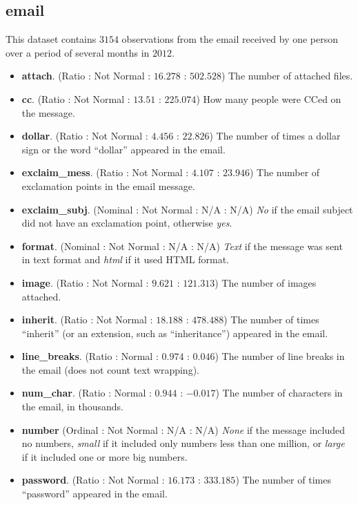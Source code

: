 \subsection{email}

This dataset contains $ 3154 $ observations from the email received by one person over a period of several months in $ 2012 $.

\begin{itemize}
  \item \textbf{attach}. (Ratio : Not Normal : $ 16.278 $ : $ 502.528 $) The number of attached files. 
  \item \textbf{cc}. (Ratio : Not Normal : $ 13.51 $ : $ 225.074 $) How many people were CCed on the message.
  \item \textbf{dollar}. (Ratio : Not Normal : $ 4.456 $ : $ 22.826 $) The number of times a dollar sign or the word ``dollar'' appeared in the email.
  \item \textbf{exclaim\_mess}. (Ratio : Not Normal : $ 4.107 $ : $ 23.946 $) The number of exclamation points in the email message.
  \item \textbf{exclaim\_subj}. (Nominal : Not Normal : N/A : N/A) \textit{No} if the email subject did not have an exclamation point, otherwise \textit{yes}.
  \item \textbf{format}. (Nominal : Not Normal : N/A : N/A) \textit{Text} if the message was sent in text format and \textit{html} if it used HTML format.
  \item \textbf{image}. (Ratio : Not Normal : $ 9.621 $ : $ 121.313 $) The number of images attached.
  \item \textbf{inherit}. (Ratio : Not Normal : $ 18.188 $ : $ 478.488 $) The number of times ``inherit'' (or an extension, such as ``inheritance'') appeared in the email.
  \item \textbf{line\_breaks}. (Ratio : Normal : $ 0.974 $ : $ 0.046 $) The number of line breaks in the email (does not count text wrapping).
  \item \textbf{num\_char}. (Ratio : Normal : $ 0.944 $ : $ -0.017 $) The number of characters in the email, in thousands.
  \item \textbf{number} (Ordinal : Not Normal : N/A : N/A) \textit{None} if the message included no numbers, \textit{small} if it included only numbers less than one million, or \textit{large} if it included one or more big numbers.
  \item \textbf{password}. (Ratio : Not Normal : $ 16.173 $ : $ 333.185 $) The number of times ``password'' appeared in the email.

\end{itemize}

